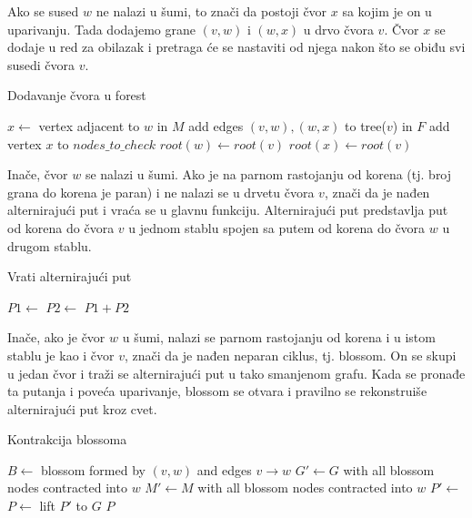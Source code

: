 \documentclass[11pt,a4paper]{article}
\theoremstyle{definition}
\begin{document}
\newpage

Ako se sused $w$ ne nalazi u šumi, to znači da postoji čvor $x$ sa kojim je on u uparivanju. Tada dodajemo grane $(v,w)$ i $(w,x)$ u drvo čvora $v$. Čvor $x$ se dodaje u red za obilazak i pretraga će se nastaviti od njega nakon što se obiđu svi susedi čvora $v$.

\begin{algorithm}[H]
\caption{Dodavanje čvora u forest}
\begin{algorithmic}
    \State $x \gets$ vertex adjacent to $w$ in $M$
    \State add edges $(v, w), (w, x)$ to tree($v$) in $F$
    \State add vertex $x$ to $nodes\_to\_check$
    \State $root(w) \gets root(v)$
    \State $root(x) \gets root(v)$
\EndFunction
\end{algorithmic}
\end{algorithm}

Inače, čvor $w$ se nalazi u šumi. Ako je na parnom rastojanju od korena (tj. broj grana do korena je paran) i ne nalazi se u drvetu čvora $v$, znači da je nađen alternirajući put i vraća se u glavnu funkciju. Alternirajući put predstavlja put od korena do čvora $v$ u jednom stablu spojen sa putem od korena do čvora $w$ u drugom stablu.

\begin{algorithm}[H]
\caption{Vrati alternirajući put}
\begin{algorithmic}
    \State $P1 \gets$ 
    \State $P2 \gets$ 
    \State \Return $P1 + P2$
\EndProcedure
\end{algorithmic}
\end{algorithm}

Inače, ako je čvor $w$ u šumi, nalazi se parnom rastojanju od korena i u istom stablu je kao i čvor $v$, znači da je nađen neparan ciklus, tj. blossom. On se skupi u jedan čvor i traži se alternirajući put u tako smanjenom grafu. Kada se pronađe ta putanja i poveća uparivanje, blossom se otvara i pravilno se rekonstruiše alternirajući put kroz cvet.

\begin{algorithm}[H]
\caption{Kontrakcija blossoma}
\begin{algorithmic}
    \State $B \gets$ blossom formed by $(v,w)$ and edges $v \rightarrow w$
    \State $G' \gets G$ with all blossom nodes contracted into $w$
    \State $M' \gets M$ with all blossom nodes contracted into $w$
    \State $P' \gets$ 
    \State $P \gets$ lift $P'$ to $G$
    \State \Return $P$
\EndFunction
\end{algorithmic}
\end{algorithm}
\end{document}

